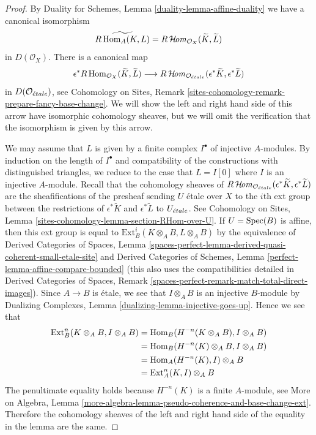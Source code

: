\begin{proof}
By Duality for Schemes, Lemma \ref{duality-lemma-affine-duality}
we have a canonical isomorphism
$$
\widetilde{R\mathop{\mathrm{Hom}}\nolimits_A(K, L)} =
R\mathop{\mathcal{H}\!\mathit{om}}\nolimits_{\mathcal{O}_X}(\widetilde{K}, \widetilde{L})
$$
in $D(\mathcal{O}_X)$. There is a canonical map
$$
\epsilon^*R\mathop{\mathrm{Hom}}\nolimits_{\mathcal{O}_X}(\widetilde{K}, \widetilde{L})
\longrightarrow
R\mathop{\mathcal{H}\!\mathit{om}}\nolimits_{\mathcal{O}_{\acute{e}tale}}(\epsilon^*\widetilde{K},
\epsilon^*\widetilde{L})
$$
in $D(\mathcal{O}_{\acute{e}tale})$, see Cohomology on Sites, Remark
\ref{sites-cohomology-remark-prepare-fancy-base-change}.
We will show the left and right hand side of this arrow
have isomorphic cohomology sheaves, but we will omit the
verification that the isomorphism is given by this arrow.

\medskip\noindent
We may assume that $L$ is given by a finite complex $I^\bullet$
of injective $A$-modules. By induction on the length of $I^\bullet$
and compatibility of the constructions with distinguished triangles,
we reduce to the case that $L = I[0]$ where $I$ is an injective $A$-module.
Recall that the cohomology sheaves of
$R\mathop{\mathcal{H}\!\mathit{om}}\nolimits_{\mathcal{O}_{\acute{e}tale}}(\epsilon^*\widetilde{K},
\epsilon^*\widetilde{L})$
are the sheafifications of the presheaf sending $U$ \'etale
over $X$ to the $i$th ext group between the restrictions of
$\epsilon^*\widetilde{K}$ and $\epsilon^*\widetilde{L}$
to $U_{\acute{e}tale}$. See
Cohomology on Sites, Lemma
\ref{sites-cohomology-lemma-section-RHom-over-U}.
If $U = \mathop{\mathrm{Spec}}(B)$ is affine, then this ext group
is equal to $\text{Ext}^i_B(K \otimes_A B, L \otimes_A B)$
by the equivalence of
Derived Categories of Spaces, Lemma
\ref{spaces-perfect-lemma-derived-quasi-coherent-small-etale-site} and
Derived Categories of Schemes, Lemma
\ref{perfect-lemma-affine-compare-bounded}
(this also uses the compatibilities detailed in
Derived Categories of Spaces, Remark
\ref{spaces-perfect-remark-match-total-direct-images}).
Since $A \to B$ is \'etale, we see that
$I \otimes_A B$ is an injective $B$-module
by Dualizing Complexes, Lemma \ref{dualizing-lemma-injective-goes-up}.
Hence we see that
\begin{align*}
\mathop{\mathrm{Ext}}\nolimits^n_B(K \otimes_A B, I \otimes_A B)
& =
\mathop{\mathrm{Hom}}\nolimits_B(H^{-n}(K \otimes_A B), I \otimes_A B) \\
& =
\mathop{\mathrm{Hom}}\nolimits_B(H^{-n}(K) \otimes_A B, I \otimes_A B) \\
& =
\mathop{\mathrm{Hom}}\nolimits_A(H^{-n}(K), I) \otimes_A B \\
& =
\text{Ext}^n_A(K, I) \otimes_A B
\end{align*}
The penultimate equality holds because $H^{-n}(K)$ is a finite $A$-module, see
More on Algebra, Lemma
\ref{more-algebra-lemma-pseudo-coherence-and-base-change-ext}.
Therefore the cohomology sheaves of the left and right hand
side of the equality in the lemma are the same.
\end{proof}

